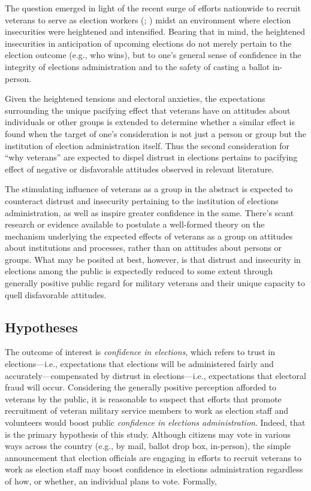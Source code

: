 \documentclass[
  12pt,
  letterpaper,
]{article}
\begin{document}
The question emerged in light of the recent surge of efforts nationwide
to recruit veterans to serve as election workers
(;
) midst an environment where
election insecurities were heightened and intensified. Bearing that in
mind, the heightened insecurities in anticipation of upcoming elections
do not merely pertain to the election outcome (e.g., who wins), but to
one's general sense of confidence in the integrity of elections
administration and to the safety of casting a ballot in-person.

Given the heightened tensions and electoral anxieties, the expectations
surrounding the unique pacifying effect that veterans have on attitudes
about individuals or other groups is extended to determine whether a
similar effect is found when the target of one's consideration is not
just a person or group but the institution of election administration
itself. Thus the second consideration for ``why veterans'' are expected
to dispel distrust in elections pertains to pacifying effect of negative
or disfavorable attitudes observed in relevant literature.

The stimulating influence of veterans as a group in the abstract is
expected to counteract distrust and insecurity pertaining to the
institution of elections administration, as well as inspire greater
confidence in the same. There's scant research or evidence available to
postulate a well-formed theory on the mechanism underlying the expected
effects of veterans as a group on attitudes about institutions and
processes, rather than on attitudes about persons or groups. What may be
posited at best, however, is that distrust and insecurity in elections
among the public is expectedly reduced to some extent through generally
positive public regard for military veterans and their unique capacity
to quell disfavorable attitudes.

\subsection{Hypotheses}\label{hypotheses}

The outcome of interest is \emph{confidence in elections}, which refers
to trust in elections---i.e., expectations that elections will be
administered fairly and accurately---compensated by distrust in
elections---i.e., expectations that electoral fraud will occur.
Considering the generally positive perception afforded to veterans by
the public, it is reasonable to suspect that efforts that promote
recruitment of veteran military service members to work as election
staff and volunteers would boost public \emph{confidence in elections
administration}. Indeed, that is the primary hypothesis of this study.
Although citizens may vote in various ways across the country (e.g., by
mail, ballot drop box, in-person), the simple announcement that election
officials are engaging in efforts to recruit veterans to work as
election staff may boost confidence in elections administration
regardless of how, or whether, an individual plans to vote. Formally,
\end{document}
